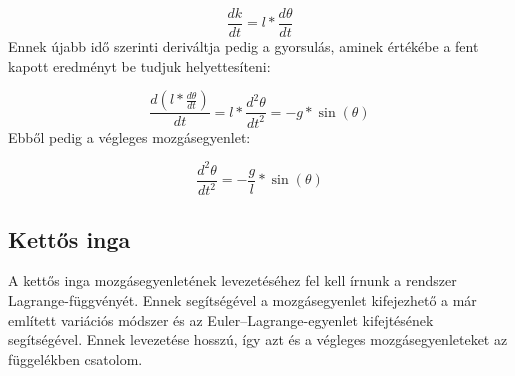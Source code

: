 \begin{multicols}{2}
\begin{equation}
    \frac{d k}{dt} = l * \frac{d \theta}{dt}
\end{equation}
Ennek újabb idő szerinti deriváltja pedig a gyorsulás, aminek értékébe a fent kapott eredményt be tudjuk helyettesíteni:

\begin{equation}
    \frac{d \left(l * \frac{d \theta}{dt} \right)}{dt}
    =
    l * \frac{d^{2} \theta}{dt^{2}}
    =
    -g * \sin{\left( \theta \right)}
\end{equation}
Ebből pedig a végleges mozgásegyenlet:

\begin{equation}
    \boxed{
    \frac{d^{2} \theta}{dt^{2}}
    =
    - \frac{g}{l} * \sin{\left( \theta \right)}
    }
\end{equation}

\subsection{Kettős inga} \label{sub:2.2}
A kettős inga mozgásegyenletének levezetéséhez fel kell írnunk a rendszer Lagrange-függvényét. Ennek segítségével a mozgásegyenlet kifejezhető a már említett variációs módszer és az Euler--Lagrange-egyenlet kifejtésének segítségével. Ennek levezetése hosszú, így azt és a végleges mozgásegyenleteket az  függelékben csatolom.


\end{multicols}
